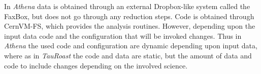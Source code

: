 In \emph{Athena} data is obtained through an external Dropbox-like system called the FaxBox, but does not go through any reduction steps. Code is obtained through 
CernVM-FS, which provides the analysis routines. However, depending upon the input data code and the configuration that will be invoked changes. 
Thus in \emph{Athena} the used code and configuration are dynamic depending upon input data, where as in \emph{TauRoast} the code and data are static, 
but the amount of data and code to include changes depending on the involved science. 


%
%
% 
